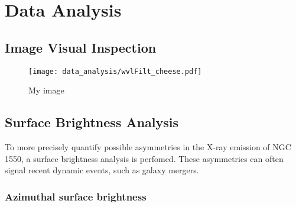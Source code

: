 
\chapter{Data Analysis}
\label{sec:data_analysis}
\section{Image Visual Inspection}
\begin{figure}[htbp]
    \centering
    \texttt{[image: data\_analysis/wvlFilt\_cheese.pdf]}
    \caption{My image}
    \label{fig:wvlFilt_cheese}
\end{figure}
\section{Surface Brightness Analysis}
To more precisely quantify possible asymmetries in the X-ray emission of NGC 1550, a surface brightness analysis is perfomed. These asymmetries can often signal recent dynamic events, such as galaxy mergers.
\subsection{Azimuthal surface brightness}
